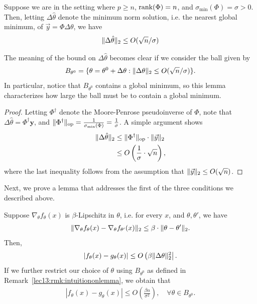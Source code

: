 \begin{lemma}[for (2)] 
    Suppose we are in the setting where $p \geq n$, $\textup{rank}(\Phi) = n$, and $\sigma_{\min}(\Phi) = \sigma > 0$. Then, letting $\Delta \hat{\theta}$ denote the minimum norm solution, i.e. the nearest global minimum, of $\vec{y} = \Phi \Delta \theta$, we have 
    \begin{align} 
        \|\Delta \hat{\theta}\|_2 \leq O(\sqrt{n} / \sigma)
    \end{align} 
\end{lemma}
\begin{remark} \label{lec13:rmk:intuitiononlemma} 
    The meaning of the bound on $\Delta \hat{\theta}$ becomes clear if we consider the ball given by 
    \begin{align}
        B_{\theta^0} = \{ \theta = \theta^0 + \Delta \theta: \|\Delta \theta\|_2 \leq O(\sqrt{n}/\sigma )\}.
    \end{align} 
    In particular, notice that $B_{\theta^0}$ contains a global minimum, so this lemma characterizes how large the ball must be to contain a global minimum. 
    \end{remark} 
\begin{proof}
    Letting $\Phi^\dagger$ denote the Moore-Penrose pseudoinverse of $\Phi$, note that $\Delta \hat{\theta} = \Phi^\dagger \boldsymbol{y}$, and $\|\Phi^\dagger\| _{\text{op}} = \frac{1}{\sigma_{\min} (\Phi)} = \frac{1}{\sigma}$.  A simple argument shows 
    \begin{align}
        \|\Delta \hat{\theta}\|_2 &\leq \|\Phi^\dagger\|_{\text{op}} \cdot \|\vec{y}\|_2 \\
        &\leq O\left( \frac{1}{\sigma}\cdot \sqrt{n} \right),
    \end{align} 
    where the last inequality follows from the assumption that $\|\vec{y}\|_2 \leq O(\sqrt{n})$. 
\end{proof}
Next, we prove a lemma that addresses the first of the three conditions we described above.
\begin{lemma}[for (1)] 
    \label{lec13:lma:accurate_approximation}
    Suppose $\nabla_\theta f_\theta(x)$ is $\beta$-Lipschitz in $\theta$, i.e. for every $x$, and $\theta, \theta'$, we have 
    \begin{align}
        \|\nabla_\theta f_{\theta} (x) - \nabla_{\theta} f_{\theta'}(x)\|_2 \leq \beta \cdot \| \theta - \theta'\|_2.
    \end{align} 
    Then, 
    \begin{align} 
        \left| f_\theta(x) - g_\theta(x) \right| \leq O \left( \beta \|\Delta \theta\|_2^2 \right|.
    \end{align}  
    If we further restrict our choice of $\theta$ using $B_{\theta^0}$ as defined in Remark~\ref{lec13:rmk:intuitiononlemma}, we obtain that
    \begin{align} 
        | f_\theta(x) - g_\theta(x) | \leq O \left( \frac{\beta n }{\sigma^2 }\right), \quad \forall \theta \in B_{\theta^0}. \label{lec13:eqn:lemma1bound} 
    \end{align} 
\end{lemma}
